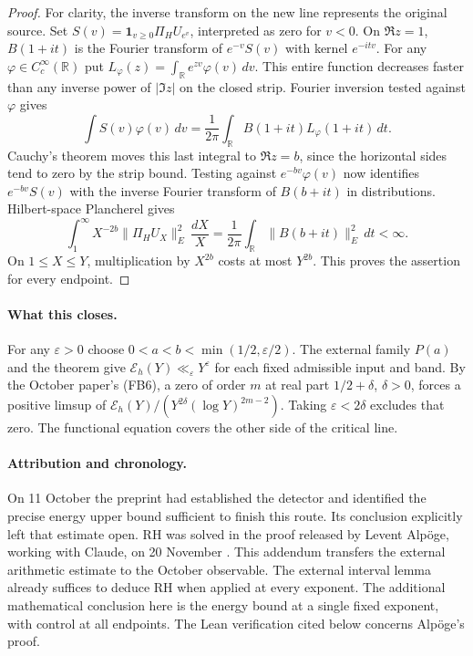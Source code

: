 \documentclass[11pt]{article}
\newcommand{\E}{\mathcal E}
\begin{document}
\begin{proof}
For clarity, the inverse transform on the new line represents the original source. Set $S(v)=\mathbf1_{v\ge0}\Pi_H U_{e^v}$, interpreted as zero for $v<0$. On $\Re z=1$, $B(1+it)$ is the Fourier transform of $e^{-v}S(v)$ with kernel $e^{-itv}$. For any $\varphi\in C_c^\infty(\mathbb R)$ put $L_\varphi(z)=\int_\mathbb R e^{zv}\varphi(v)\,dv$. This entire function decreases faster than any inverse power of $|\Im z|$ on the closed strip. Fourier inversion tested against $\varphi$ gives
\[
 \int S(v)\varphi(v)\,dv
 =\frac1{2\pi}\int_\mathbb R B(1+it)L_\varphi(1+it)\,dt .
\]
Cauchy's theorem moves this last integral to $\Re z=b$, since the horizontal sides tend to zero by the strip bound. Testing against $e^{-bv}\varphi(v)$ now identifies $e^{-bv}S(v)$ with the inverse Fourier transform of $B(b+it)$ in distributions. Hilbert-space Plancherel gives
\[
 \int_1^\infty X^{-2b}\|\Pi_H U_X\|_E^2\,\frac{dX}{X}
 =\frac1{2\pi}\int_\mathbb R\|B(b+it)\|_E^2\,dt<\infty .
\]
On $1\le X\le Y$, multiplication by $X^{2b}$ costs at most $Y^{2b}$. This proves the assertion for every endpoint.
\end{proof}

\paragraph{What this closes.}
For any $\varepsilon>0$ choose $0<a<b<\min(1/2,\varepsilon/2)$. The external family $P(a)$ and the theorem give $\E_h(Y)\ll_\varepsilon Y^\varepsilon$ for each fixed admissible input and band. By the October paper's (FB6), a zero of order $m$ at real part $1/2+\delta$, $\delta>0$, forces a positive limsup of
$\E_h(Y)/(Y^{2\delta}(\log Y)^{2m-2})$. Taking $\varepsilon<2\delta$ excludes that zero. The functional equation covers the other side of the critical line.

\paragraph{Attribution and chronology.}
On 11 October the preprint \cite{original} had established the detector and identified the precise energy upper bound sufficient to finish this route. Its conclusion explicitly left that estimate open. RH was solved in the proof released by Levent Alp\"oge, working with Claude, on 20 November \cite{announcement,verification}. This addendum transfers the external arithmetic estimate to the October observable. The external interval lemma already suffices to deduce RH when applied at every exponent. The additional mathematical conclusion here is the energy bound at a single fixed exponent, with control at all endpoints. The Lean verification cited below concerns Alp\"oge's proof.
\end{document}
